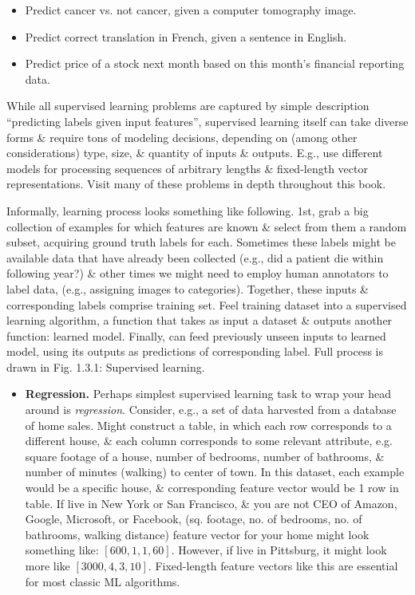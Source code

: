 \documentclass{article}
\begin{document}
\begin{itemize}
\begin{itemize}
\begin{itemize}
			\begin{itemize}
				\item Predict cancer vs. not cancer, given a computer tomography image.
				\item Predict correct translation in French, given a sentence in English.
				\item Predict price of a stock next month based on this month's financial reporting data.
			\end{itemize}
			While all supervised learning problems are captured by simple description ``predicting labels given input features'', supervised learning itself can take diverse forms \& require tons of modeling decisions, depending on (among other considerations) type, size, \& quantity of inputs \& outputs. E.g., use different models for processing sequences of arbitrary lengths \& fixed-length vector representations. Visit many of these problems in depth throughout this book.
			
			Informally, learning process looks something like following. 1st, grab a big collection of examples for which features are known \& select from them a random subset, acquiring ground truth labels for each. Sometimes these labels might be available data that have already been collected (e.g., did a patient die within following year?) \& other times we might need to employ human annotators to label data, (e.g., assigning images to categories). Together, these inputs \& corresponding labels comprise training set. Feel training dataset into a supervised learning algorithm, a function that takes as input a dataset \& outputs another function: learned model. Finally, can feed previously unseen inputs to learned model, using its outputs as predictions of corresponding label. Full process is drawn in {\sf Fig. 1.3.1: Supervised learning}.
			\begin{itemize}
				\item {\bf Regression.} Perhaps simplest supervised learning task to wrap your head around is {\it regression}. Consider, e.g., a set of data harvested from a database of home sales. Might construct a table, in which each row corresponds to a different house, \& each column corresponds to some relevant attribute, e.g. square footage of a house, number of bedrooms, number of bathrooms, \& number of minutes (walking) to center of town. In this dataset, each example would be a specific house, \& corresponding feature vector would be 1 row in table. If live in New York or San Francisco, \& you are not CEO of Amazon, Google, Microsoft, or Facebook, (sq. footage, no. of bedrooms, no. of bathrooms, walking distance) feature vector for your home might look something like: $[600,1,1,60]$. However, if live in Pittsburg, it might look more like $[3000,4,3,10]$. Fixed-length feature vectors like this are essential for most classic ML algorithms.
				

\end{itemize}
\end{itemize}
\end{itemize}
\end{itemize}
\end{document}

